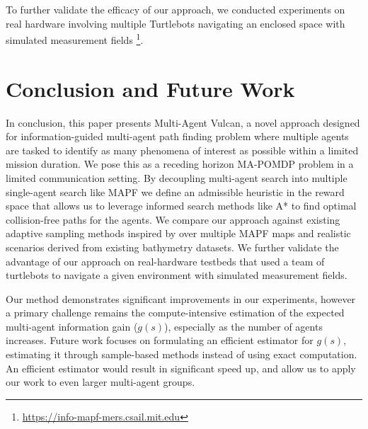 \documentclass[letterpaper, 10 pt, conference]{IEEEConference}
\begin{document}

To further validate the efficacy of our approach, we conducted experiments on real hardware involving multiple Turtlebots navigating an enclosed space with simulated measurement fields \footnote{\url{https://info-mapf-mers.csail.mit.edu}}.

\section{Conclusion and Future Work}

In conclusion, this paper presents Multi-Agent Vulcan, a novel approach designed for information-guided multi-agent path finding problem where multiple agents are tasked to identify as many phenomena of interest as possible within a limited mission duration. We pose this as a receding horizon MA-POMDP problem in a limited communication setting. By decoupling multi-agent search into multiple single-agent search like MAPF we define an admissible heuristic in the reward space that allows us to leverage informed search methods like A* to find optimal collision-free paths for the agents. We compare our approach against existing adaptive sampling methods inspired by \cite{ayton2017} over multiple MAPF maps and realistic scenarios derived from existing bathymetry datasets. We further validate the advantage of our approach on real-hardware testbeds that used a team of turtlebots to navigate a given environment with simulated measurement fields.

Our method demonstrates significant improvements in our experiments, however a primary challenge remains the compute-intensive estimation of the expected multi-agent information gain ($g(s)$), especially as the number of agents increases. Future work focuses on formulating an efficient estimator for $g(s)$, estimating it through sample-based methods instead of using exact computation. An efficient estimator would result in significant speed up, and allow us to apply our work to even larger multi-agent groups.


\addtolength{\textheight}{-12cm}


\end{document}
